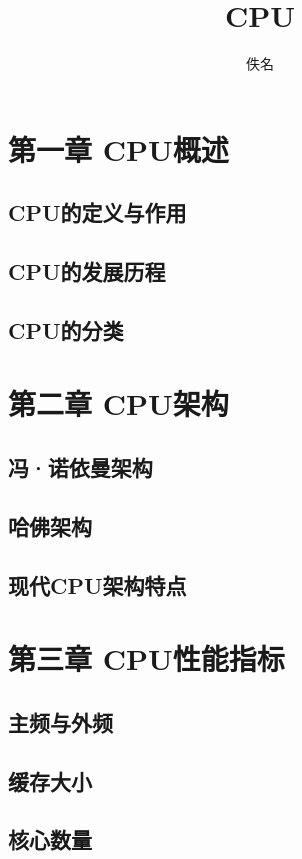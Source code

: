 \documentclass[12pt,UTF8]{ctexbook}
\title{\heiti\zihao{0} CPU}
\author{佚名}
\date{}
\begin{document}
\maketitle
\tableofcontents

\frontmatter

\mainmatter

\chapter{第一章 CPU概述}

\section{CPU的定义与作用}
\section{CPU的发展历程}
\section{CPU的分类}

\chapter{第二章 CPU架构}

\section{冯·诺依曼架构}
\section{哈佛架构}
\section{现代CPU架构特点}

\chapter{第三章 CPU性能指标}

\section{主频与外频}
\section{缓存大小}
\section{核心数量}
\end{document}
